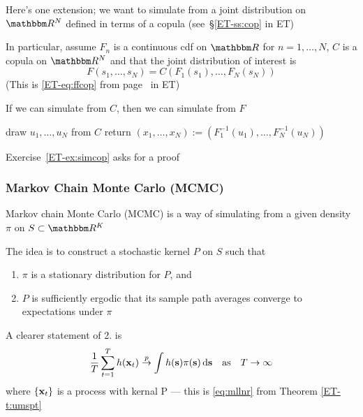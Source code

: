 \begin{frame}
    
    \vspace{2em}
    Here's one extension; we want to simulate from a joint distribution on $\RR^N$
    defined in terms
    of a copula (see~\S\ref{ET-ss:cop} in ET) 
    
    In particular, assume $F_n$ is a
    continuous {\sc cdf} on $\RR$ for $n=1,\ldots, N$, $C$ is a copula on
    $\RR^N$ and that the joint distribution of interest is
    \begin{equation*}
        F(s_1, \ldots, s_N) = C(F_1(s_1), \ldots, F_N(s_N))
    \end{equation*}
    (This is \eqref{ET-eq:ffcop} from page~\pageref{ET-eq:ffcop} in ET)
    
    If we can simulate from $C$, then we can simulate from $F$

    \begin{algorithmic}[1]
        \State draw $u_1, \ldots, u_N$ from $C$
        \State return $(x_1, \ldots, x_N) := (F^{-1}_1 (u_1), \ldots, F^{-1}_N(u_N))$
    \end{algorithmic}
    
    Exercise~\ref{ET-ex:simcop} asks for a proof
    
\end{frame}

\begin{frame}\frametitle{Markov Chain Monte Carlo (MCMC)}

    \vspace{2em}
    Markov chain Monte Carlo (MCMC) is a way of simulating from a given density
    $\pi$ on $S \subset \RR^K$
    
    The idea is to construct a stochastic
    kernel $P$ on $S$ such that 
    \begin{enumerate}
        \item $\pi$ is a stationary distribution for $P$, and 
        \item $P$ is sufficiently ergodic that its sample path 
            averages converge to expectations under $\pi$
    \end{enumerate}
    
    A clearer statement of 2. is 
    \begin{equation*}
    \frac{1}{T} \sum_{t=1}^T h({\mathbf x}_t) 
    \stackrel { p } {\to} 
    \int h({\mathbf s}) \pi({\mathbf s}) \mathop{}\!\mathrm{d} {\mathbf s}
    \quad \text{as} \quad
    T \to \infty
    \end{equation*}
    where $\{{\mathbf x}_{t}\}$ is a process with kernal P --- this is \eqref{eq:mllnr}  from Theorem \ref{ET-t:umspt}
    
\end{frame}
    
